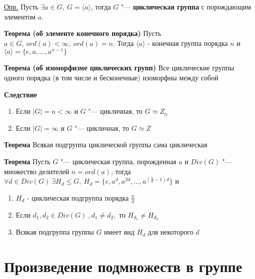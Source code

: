\documentclass{article}
\begin{document}
\vspace{10pt}

\par \underline{Опр.} Пусть $\exists a \in G, \  G = \langle a \rangle$, тогда $G$ "--- \textbf{циклическая группа} с порождающим элементом $a$.

\vspace{10pt}

\textbf{Теорема (об элементе конечного порядка)}
Пусть $a \in G, \  ord(a) < \infty, \  ord(a) = n$. Тогда $\langle a \rangle$ - конечная группа порядка $n$ и $\langle a \rangle = \{e, a, ... , a^{n-1}\}$

\vspace{10pt}

\textbf{Теорема (об изоморфизме циклических групп)}
Все циклические группы одного порядка (в том числе и бесконечные) изоморфны между собой

\vspace{10pt}

\textbf{Следствие}
\begin{enumerate}
	\item Если $|G| = n < \infty$ и $G$ "--- цикличная, то $G \simeq Z_n$
	\item Если $|G| = \infty$ и $G$ "--- цикличная, то $G \simeq Z$

\end{enumerate}

\vspace{10pt}

\textbf{Теорема}
Всякая подгруппа циклической группы сама циклическая

\vspace{10pt}

\textbf{Теорема}
Пусть $G$ "--- циклическая группа, порожденная $a$ и $Div(G)$ "--- множество делителей $n = ord(a)$, тогда $\forall d \in Div(G) \  \exists H_d \le G, \  H_d = \{e, a^d, a^{2d}, ... , a^{(\frac{n}{d} - 1)d}\}$ и
\begin{enumerate}
	\item $H_d$ - циклическая подгруппа порядка $\frac{n}{d}$
	\item Если $d_1, d_2 \in Div(G) \ , d_1 \neq d_2,$ то $H_{d_1} \neq H_{d_2}$
	\item Всякая подгруппа группы $G$ имеет вид $H_d$ для некоторого $d$
\end{enumerate}

\section{Произведение подмножеств в группе}
\end{document}
